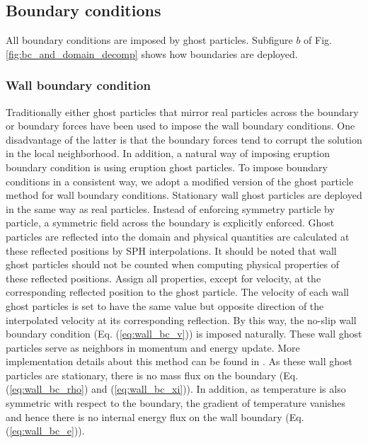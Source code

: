 \documentclass[journal abbreviation, manuscript]{copernicus}
\begin{document}
\subsection{Boundary conditions}
All boundary conditions are imposed by ghost particles. Subfigure $b$ of Fig. \ref{fig:bc_and_domain_decomp} shows how boundaries are deployed. 
\subsubsection{Wall boundary condition}
Traditionally either ghost particles that mirror real particles across the boundary \citep {ferrari2009new} or boundary forces \citep {monaghan2009sph} have been used to impose the wall boundary conditions. One disadvantage of the latter  is that the boundary forces tend to corrupt the solution in the local neighborhood. In addition, a natural way of imposing eruption boundary condition is using eruption ghost particles. To impose boundary conditions in a consistent way, we adopt a modified version of the ghost particle method \citep {kumar2013parallel} for wall boundary conditions. Stationary wall ghost particles are deployed in the same way as real particles. Instead of enforcing symmetry particle by particle, a symmetric field across the boundary is explicitly enforced. Ghost particles are reflected into the domain and physical quantities are calculated at these reflected positions by SPH interpolations. It should be noted that wall ghost particles should not be counted when computing physical properties of these reflected positions. Assign all properties, except for velocity, at the corresponding reflected position to the ghost particle. The velocity of each wall ghost particles is set to have the same value but opposite direction of the interpolated velocity at its corresponding reflection. By this way, the no-slip wall boundary condition (Eq. (\ref{eq:wall_bc_v})) is imposed naturally. These wall ghost particles serve as neighbors in momentum and energy update. More implementation details about this method can be found in \citep {kumar2013parallel}. As these wall ghost particles are stationary, there is no mass flux on the boundary (Eq. (\ref{eq:wall_bc_rho}) and (\ref{eq:wall_bc_xi})). In addition, as temperature is also symmetric with respect to the boundary, the gradient of temperature vanishes and hence there is no internal energy flux on the wall boundary (Eq. (\ref{eq:wall_bc_e})). 
\end{document}
